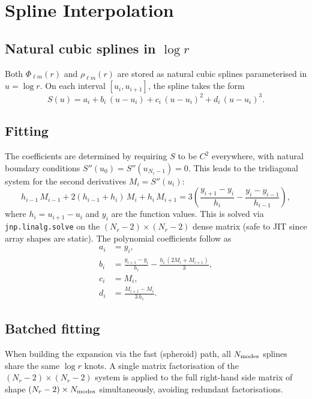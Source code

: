 \documentclass[11pt]{article}
\begin{document}
\section{Spline Interpolation}

\subsection{Natural cubic splines in $\log r$}

Both $\Phi_{\ell m}(r)$ and $\rho_{\ell m}(r)$ are stored as natural cubic
splines parameterised in $u = \log r$.  On each interval
$[u_i, u_{i+1}]$, the spline takes the form
\begin{equation}
  S(u) = a_i + b_i\,(u - u_i) + c_i\,(u-u_i)^2 + d_i\,(u-u_i)^3.
\end{equation}

\subsection{Fitting}

The coefficients are determined by requiring $S$ to be $C^2$ everywhere, with
natural boundary conditions $S''(u_0) = S''(u_{N_r-1}) = 0$.  This leads to
the tridiagonal system for the second derivatives $M_i = S''(u_i)$:
\begin{equation}
  h_{i-1}\,M_{i-1} + 2(h_{i-1}+h_i)\,M_i + h_i\,M_{i+1}
  = 3\!\left(\frac{y_{i+1}-y_i}{h_i} - \frac{y_i - y_{i-1}}{h_{i-1}}\right),
\end{equation}
where $h_i = u_{i+1} - u_i$ and $y_i$ are the function values.  This is
solved via \texttt{jnp.linalg.solve} on the $(N_r-2)\times(N_r-2)$ dense
matrix (safe to JIT since array shapes are static).  The polynomial
coefficients follow as
\begin{align}
  a_i &= y_i, \\
  b_i &= \frac{y_{i+1}-y_i}{h_i} - \frac{h_i\,(2M_i + M_{i+1})}{3}, \\
  c_i &= M_i, \\
  d_i &= \frac{M_{i+1} - M_i}{3\,h_i}.
\end{align}

\subsection{Batched fitting}

When building the expansion via the fast (spheroid) path, all $N_{\rm modes}$
splines share the same $\log r$ knots.  A single matrix factorisation of the
$(N_r-2)\times(N_r-2)$ system is applied to the full right-hand side matrix
of shape $(N_r-2)\times N_{\rm modes}$ simultaneously, avoiding redundant
factorisations.
\end{document}
